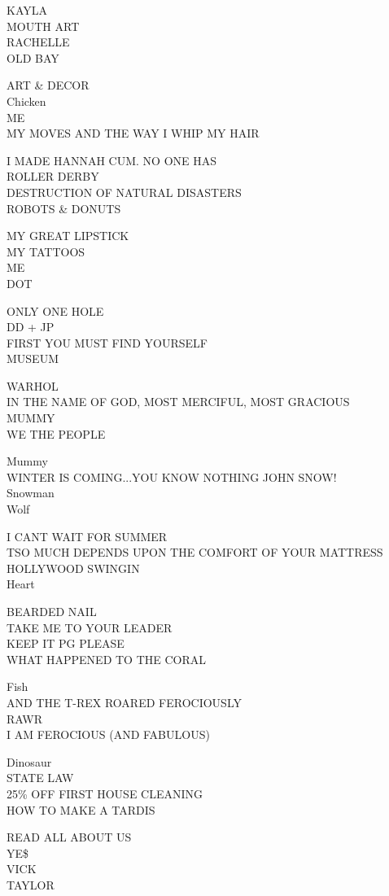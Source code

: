 \documentclass[10pt,letterpaper]{article}
\begin{document}
KAYLA\\
MOUTH ART\\
RACHELLE\\
OLD BAY

ART \& DECOR\\
Chicken\\
ME\\
MY MOVES AND THE WAY I WHIP MY HAIR

I MADE HANNAH CUM.  NO ONE HAS\\
ROLLER DERBY\\
DESTRUCTION OF NATURAL DISASTERS\\
ROBOTS \& DONUTS

MY GREAT LIPSTICK\\
MY TATTOOS\\
ME\\
DOT

ONLY ONE HOLE\\
DD + JP\\
FIRST YOU MUST FIND YOURSELF\\
MUSEUM

WARHOL\\
IN THE NAME OF GOD, MOST MERCIFUL, MOST GRACIOUS\\
MUMMY\\
WE THE PEOPLE

Mummy\\
WINTER IS COMING...YOU KNOW NOTHING JOHN SNOW!\\
Snowman\\
Wolf

I CANT WAIT FOR SUMMER\\
TSO MUCH DEPENDS UPON THE COMFORT OF YOUR MATTRESS\\
HOLLYWOOD SWINGIN\\
Heart

BEARDED NAIL\\
TAKE ME TO YOUR LEADER\\
KEEP IT PG PLEASE\\
WHAT HAPPENED TO THE CORAL

Fish\\
AND THE T{-}REX ROARED FEROCIOUSLY\\
RAWR\\
I AM FEROCIOUS (AND FABULOUS)

Dinosaur\\
STATE LAW\\
25\% OFF FIRST HOUSE CLEANING\\
HOW TO MAKE A TARDIS

READ ALL ABOUT US\\
YE\$\\
VICK\\
TAYLOR
\end{document}
